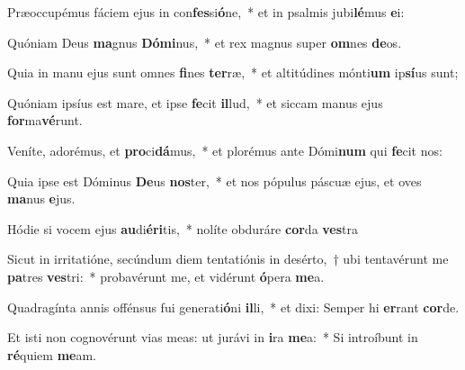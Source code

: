 \item Præoccupémus fáciem ejus in con\textbf{fes}si\textbf{ó}ne,~* et in psalmis jubi\textbf{lé}mus \textbf{e}i:
\item Quóniam Deus \textbf{ma}gnus \textbf{Dó}\textbf{mi}nus,~* et rex magnus super \textbf{om}nes \textbf{de}os.
\item Quia in manu ejus sunt omnes \textbf{fi}nes \textbf{ter}ræ,~* et altitúdines mónti\textbf{um} ip\textbf{sí}us sunt;
\item Quóniam ipsíus est mare, et ipse \textbf{fe}cit \textbf{il}lud,~* et siccam manus ejus \textbf{for}ma\textbf{vé}runt.
\item Veníte, adorémus, et \textbf{pro}ci\textbf{dá}mus,~* et plorémus ante Dómi\textbf{num} qui \textbf{fe}cit nos:
\item Quia ipse est Dóminus \textbf{De}us \textbf{nos}ter,~* et nos pópulus páscuæ ejus, et oves \textbf{ma}nus \textbf{e}jus.
\item Hódie si vocem ejus \textbf{au}di\textbf{é}\textbf{ri}tis,~* nolíte obduráre \textbf{cor}da \textbf{ves}tra
\item Sicut in irritatióne, secúndum diem tentatiónis in desérto,~† ubi tentavérunt me \textbf{pa}tres \textbf{ves}tri:~* probavérunt me, et vidérunt \textbf{ó}pera \textbf{me}a.
\item Quadragínta annis offénsus fui generati\textbf{ó}ni \textbf{il}li,~* et dixi: Semper hi \textbf{er}rant \textbf{cor}de.
\item Et isti non cognovérunt vias meas: ut jurávi in \textbf{i}ra \textbf{me}a:~* Si introíbunt in \textbf{ré}quiem \textbf{me}am.
